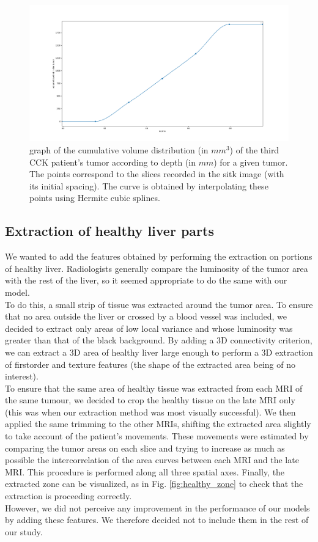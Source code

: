 \documentclass[preprint,12pt]{elsarticle}
\begin{document}
\begin{figure}[tbp]
    \centering
    \includegraphics[scale = 0.25]{./images/plot_depth_volume_2.png}
    \caption{graph of the cumulative volume distribution (in $mm^3$) of the third CCK patient's tumor according to depth (in $mm$) for a given tumor. The points correspond to the slices recorded in the sitk image (with its initial spacing). The curve is obtained by interpolating these points using Hermite cubic splines.}
    \label{fig:depth_volume}
\end{figure}

\subsection{Extraction of healthy liver parts}
We wanted to add the features obtained by performing the extraction on portions of healthy liver. Radiologists generally compare the luminosity of the tumor area with the rest of the liver, so it seemed appropriate to do the same with our model.\\
\indent To do this, a small strip of tissue was extracted around the tumor area. To ensure that no area outside the liver or crossed by a blood vessel was included, we decided to extract only areas of low local variance and whose luminosity was greater than that of the black background. By adding a 3D connectivity criterion, we can extract a 3D area of healthy liver large enough to perform a 3D extraction of firstorder and texture features (the shape of the extracted area being of no interest).\\
\indent To ensure that the same area of healthy tissue was extracted from each MRI of the same tumour, we decided to crop the healthy tissue on the late MRI only (this was when our extraction method was most visually successful). We then applied the same trimming to the other MRIs, shifting the extracted area slightly to take account of the patient's movements. These movements were estimated by comparing the tumor areas on each slice and trying to increase as much as possible the intercorrelation of the area curves between each MRI and the late MRI. This procedure is performed along all three spatial axes. Finally, the extracted zone can be visualized, as in Fig. \ref{fig:healthy_zone} to check that the extraction is proceeding correctly.\\
\indent However, we did not perceive any improvement in the performance of our models by adding these features. We therefore decided not to include them in the rest of our study.\\
\end{document}
